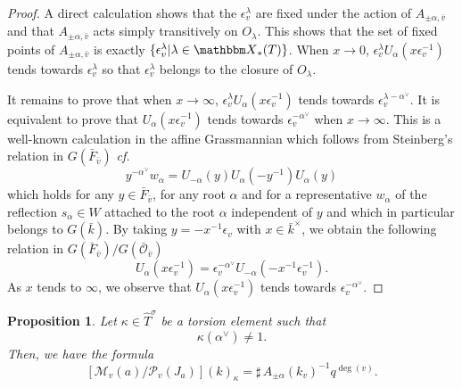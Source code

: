 \documentclass[12pt,english]{smfart}
\numberwithin{equation}{subsection}
\newtheorem{proposition}[equation]{Proposition}
\theoremstyle{remark}
\newcommand\calP{{\mathscr P}}
\newcommand\calM{{\mathscr M}}
\newcommand\calO{{\mathscr O}}
\newcommand\bbX{{\mathbbm X}}
\newcommand\cf{{\it cf.\ }}
\begin{document}
\begin{proof}
A direct calculation shows that the $\epsilon_v^\lambda$ are fixed under
the action of $A_{\pm \alpha,\bar v}$ and that $A_{\pm \alpha,\bar v}$ acts
simply transitively on $O_\lambda$. This shows that the set
of fixed points of $A_{\pm \alpha,\bar v}$ is exactly
$\{\epsilon_v^\lambda| \lambda\in \bbX_*(T)\}$. When $x\rightarrow 0$,
$\epsilon_v^\lambda U_\alpha(x \epsilon_v^{-1})$ tends towards
$\epsilon_v^\lambda$ so that $\epsilon_v^\lambda$ belongs to
the closure of $O_\lambda$.

It remains to prove that when $x\rightarrow \infty$,
$\epsilon_v^\lambda U_\alpha(x \epsilon_v^{-1})$ tends towards
$\epsilon_v^{\lambda-\alpha^\vee}$. It is equivalent to prove
that $U_\alpha(x \epsilon_v^{-1})$ tends towards $\epsilon_v^{-\alpha^\vee}$
when $x\rightarrow \infty$. This is a well-known calculation in the
affine Grassmannian which follows from Steinberg's relation in
$G(\bar F_{\bar v})$ \cf \cite[chap. 3, lemma 19]{St}
$$y^{-\alpha^\vee} w_\alpha= U_{-\alpha}(y) U_{\alpha}(-y^{-1}) U_\alpha(y)$$
which holds for any $y\in \bar F_{\bar v}$, for any root $\alpha$ and
for a representative $w_\alpha$ of the reflection $s_\alpha\in W$
attached to the root $\alpha$ independent of $y$ and which in particular
belongs to $G(\bar k)$. By taking $y=-x^{-1} \epsilon_v$ with $x\in
\bar k^\times$, we obtain the following relation in $G(\bar F_{\bar v})/
G(\bar \calO_{\bar v})$
$$U_\alpha(x \epsilon_v^{-1})=\epsilon_v^{-\alpha^\vee} U_{-\alpha}(-x^{-1}\epsilon_v^{-1}).$$
As $x$ tends to $\infty$, we observe that $U_\alpha(x
\epsilon_v^{-1})$ tends towards $\epsilon_v^{-\alpha^\vee}$.
\end{proof}

\begin{proposition}\label{comptage fibre simple}
Let $\kappa\in \hat T^\sigma$ be a torsion element such that
$$\kappa(\alpha^\vee)\not =1.$$
Then, we have the formula
$$[\calM_v(a)/\calP_v(J_a)](k)_\kappa=  \sharp\, A_{\pm\alpha}(k_v)^{-1} q^{\deg(v)}.$$
\end{proposition}
\end{document}
